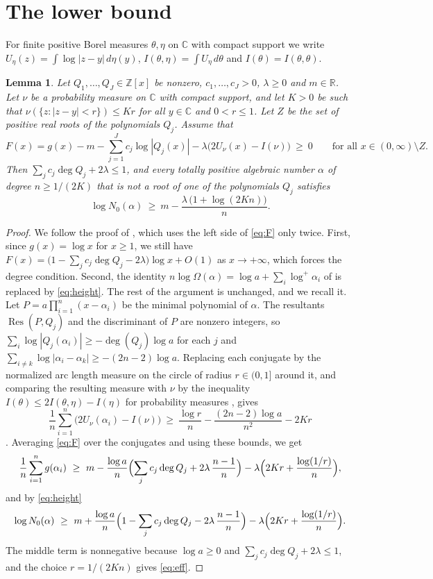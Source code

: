 \documentclass[11pt]{amsart}
\newtheorem{lemma}[theorem]{Lemma}
\theoremstyle{remark}
\numberwithin{equation}{section}
\newcommand{\R}{\mathbb{R}}
\newcommand{\Z}{\mathbb{Z}}
\newcommand{\C}{\mathbb{C}}
\newcommand{\logp}{\log^{+}}
\newcommand{\Res}{\operatorname{Res}}
\begin{document}
\section{The lower bound}\label{sec:lower}

For finite positive Borel measures $\theta,\eta$ on $\C$ with compact support we write $U_\eta(z)=\int\log|z-y|\,d\eta(y)$, $I(\theta,\eta)=\int U_\eta\,d\theta$ and $I(\theta)=I(\theta,\theta)$.

\begin{lemma}\label{lem:aux}
Let $Q_1,\dots,Q_J\in\Z[x]$ be nonzero, $c_1,\dots,c_J>0$, $\lambda\ge0$ and $m\in\R$. Let $\nu$ be a probability measure on $\C$ with compact support, and let $K>0$ be such that $\nu(\{z:|z-y|<r\})\le Kr$ for all $y\in\C$ and $0<r\le1$. Let $Z$ be the set of positive real roots of the polynomials $Q_j$. Assume that
\begin{equation}\label{eq:F}
F(x)=g(x)-m-\sum_{j=1}^Jc_j\log|Q_j(x)|-\lambda\bigl(2U_\nu(x)-I(\nu)\bigr)\ \ge\ 0\qquad\text{for all }x\in(0,\infty)\setminus Z.
\end{equation}
Then $\sum_jc_j\deg Q_j+2\lambda\le1$, and every totally positive algebraic number $\alpha$ of degree $n\ge1/(2K)$ that is not a root of one of the polynomials $Q_j$ satisfies
\begin{equation}\label{eq:eff}
\log N_0(\alpha)\ \ge\ m-\frac{\lambda\,\bigl(1+\log(2Kn)\bigr)}{n}.
\end{equation}
\end{lemma}

\begin{proof}
We follow the proof of \cite[Lemma~2.2]{Tom26a}, which uses the left side of \eqref{eq:F} only twice. First, since $g(x)=\log x$ for $x\ge1$, we still have $F(x)=\bigl(1-\sum_jc_j\deg Q_j-2\lambda\bigr)\log x+O(1)$ as $x\to+\infty$, which forces the degree condition. Second, the identity $n\log\Omega(\alpha)=\log a+\sum_i\logp\alpha_i$ of \cite[(2.5)]{Tom26a} is replaced by \eqref{eq:height}. The rest of the argument is unchanged, and we recall it. Let $P=a\prod_{i=1}^n(x-\alpha_i)$ be the minimal polynomial of $\alpha$. The resultants $\Res(P,Q_j)$ and the discriminant of $P$ are nonzero integers, so $\sum_i\log|Q_j(\alpha_i)|\ge-\deg(Q_j)\log a$ for each $j$ and $\sum_{i\ne k}\log|\alpha_i-\alpha_k|\ge-(2n-2)\log a$. Replacing each conjugate by the normalized arc length measure on the circle of radius $r\in(0,1]$ around it, and comparing the resulting measure with $\nu$ by the inequality $I(\theta)\le2I(\theta,\eta)-I(\eta)$ for probability measures \cite[Lemma~2.1]{Tom26a}, gives
\[
\frac1n\sum_{i=1}^n\bigl(2U_\nu(\alpha_i)-I(\nu)\bigr)\ \ge\ \frac{\log r}n-\frac{(2n-2)\log a}{n^2}-2Kr
\]
\cite[(2.9)]{Tom26a}. Averaging \eqref{eq:F} over the conjugates and using these bounds, we get
\[
\frac1n\sum_{i=1}^ng(\alpha_i)\ \ge\ m-\frac{\log a}n\Bigl(\sum_jc_j\deg Q_j+2\lambda\,\frac{n-1}n\Bigr)-\lambda\Bigl(2Kr+\frac{\log(1/r)}n\Bigr),
\]
and by \eqref{eq:height}
\[
\log N_0(\alpha)\ \ge\ m+\frac{\log a}n\Bigl(1-\sum_jc_j\deg Q_j-2\lambda\,\frac{n-1}n\Bigr)-\lambda\Bigl(2Kr+\frac{\log(1/r)}n\Bigr).
\]
The middle term is nonnegative because $\log a\ge0$ and $\sum_jc_j\deg Q_j+2\lambda\le1$, and the choice $r=1/(2Kn)$ gives \eqref{eq:eff}.
\end{proof}
\end{document}
